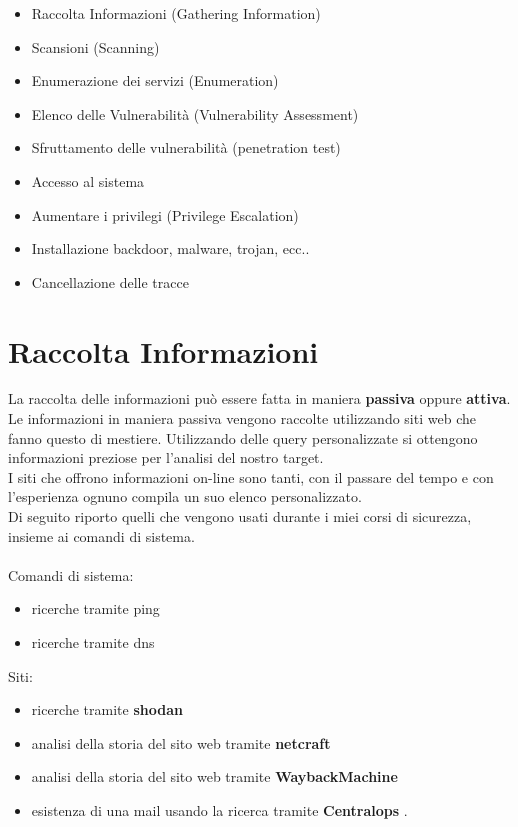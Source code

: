 \documentclass[a4paper,12pt]{article}
\begin{document}
\begin{itemize}
    \item Raccolta Informazioni (Gathering Information)
    \item Scansioni (Scanning)
    \item Enumerazione  dei servizi (Enumeration)
    \item Elenco delle Vulnerabilità (Vulnerability Assessment)
    \item Sfruttamento delle vulnerabilità (penetration test)
    \item Accesso al sistema
    \item Aumentare i privilegi (Privilege Escalation)
    \item Installazione backdoor, malware, trojan, ecc..
    \item Cancellazione delle tracce

\end{itemize}

\section{Raccolta Informazioni}

La raccolta delle informazioni può essere fatta in maniera \textbf{passiva} oppure \textbf{attiva}. 
Le informazioni in maniera passiva vengono raccolte utilizzando siti web che fanno questo di mestiere. Utilizzando delle query personalizzate si ottengono informazioni preziose per l'analisi del nostro target. \\
I siti che offrono informazioni on-line sono tanti, con il passare del tempo e con l'esperienza ognuno compila un suo elenco personalizzato. \\ Di seguito riporto quelli che vengono usati durante i miei corsi di sicurezza, insieme ai comandi di sistema.\\ 
\\
Comandi di sistema:

\begin{itemize}
    \item ricerche tramite ping 
    \item ricerche tramite dns
\end{itemize}
Siti:
\begin{itemize}
    \item ricerche tramite \textbf{shodan} \cite{shodan}
    \item analisi della storia del sito web tramite \textbf{netcraft} \cite{netcraft}
    \item analisi della storia del sito web tramite \textbf{WaybackMachine} \cite{wayback}
    \item esistenza di una mail usando la ricerca tramite \textbf{Centralops} \cite{centralops}.
\end{itemize}
\end{document}
